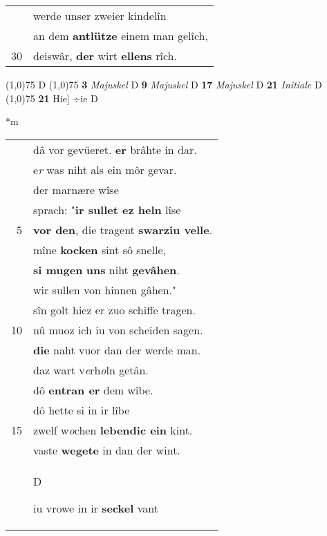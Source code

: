 \documentclass[8pt,a4paper,notitlepage]{article}
\begin{document}
\begin{table}[ht]
\begin{minipage}[t]{0.5\linewidth}
\begin{tabular}{rl}
 & werde unser zweier kindelîn\\ 
 & an dem \textbf{antlütze} einem man gelîch,\\ 
30 & deiswâr, \textbf{der} wirt \textbf{ellens} rîch.\\ 
\end{tabular}
\scriptsize
\line(1,0){75} \newline
D \newline
\line(1,0){75} \newline
\textbf{3} \textit{Majuskel} D  \textbf{9} \textit{Majuskel} D  \textbf{17} \textit{Majuskel} D  \textbf{21} \textit{Initiale} D  \newline
\line(1,0){75} \newline
\textbf{21} Hie] ÷ie D \newline
\end{minipage}
\hspace{0.5cm}
\begin{minipage}[t]{0.5\linewidth}
\small
\begin{center}*m
\end{center}
\begin{tabular}{rl}
 & dâ vor gevüeret. \textbf{er} brâhte in dar.\\ 
 & e\textit{r} was niht als ein môr gevar.\\ 
 & der marnære wîse\\ 
 & sprach: "\textbf{ir sullet ez heln} lîse\\ 
5 & \textbf{vor den}, die tragent \textbf{swarziu velle}.\\ 
 & mîne \textbf{kocken} sint sô snelle,\\ 
 & \textbf{si mugen} \textbf{uns} niht \textbf{gevâhen}.\\ 
 & wir sullen von hinnen gâhen."\\ 
 & sîn golt hiez er zuo schiffe tragen.\\ 
10 & nû muoz ich iu von scheiden sagen.\\ 
 & \textbf{die} naht vuor dan der werde man.\\ 
 & daz wart v\textit{e}rh\textit{o}ln getân.\\ 
 & dô \textbf{entran er} dem wîbe.\\ 
 & dô hette si in ir lîbe\\ 
15 & zwelf w\textit{o}chen \textbf{lebendic ein} kint.\\ 
 & vaste \textbf{wegete} in dan der wint.\\ 
 & \begin{large}D\end{large}iu vrowe in ir \textbf{seckel} vant\\ 

\end{tabular}
\end{minipage}
\end{table}
\end{document}

